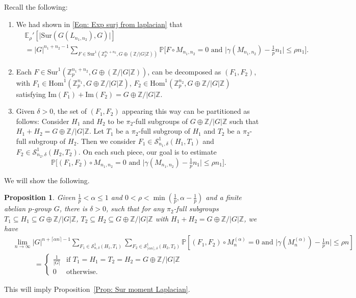 \documentclass[12pt]{amsart}
\newtheorem{proposition}[theorem]{Proposition}
\theoremstyle{definition}
\newcommand{\PPP}{\mathbb{P}}
\newcommand{\SSO}[3]{\mathcal{S}^1_{#1}(#2,#3)}
\newcommand{\Mnot}{M_{n_1,n_2}}
\newcommand{\Lnot}{L_{n_1,n_2}}
\newcommand{\Mna}{M_{n}^{(\alpha)}}
\newcommand{\Erhop}{\E_{\rho}'}
\newcommand{\ZG}{\Z/\abs{G}\Z}
\newcommand{\abs}[1]{\vert#1\vert}
\newcommand{\im}{\text{Im}}
\newcommand{\Zpnot}{\Z_p^{n_1+n_2}}
\newcommand{\Zp}{\Z_p}
\newcommand{\E}{\mathbb{E}}
\newcommand{\Z}{\mathbb{Z}}
\newcommand{\Hom}{\text{Hom}}
\newcommand{\Sur}{\text{Sur}}
\newcommand{\ceil}[1]{\lceil#1\rceil}
\begin{document}
Recall the following:
\begin{enumerate}
    \item We had shown in \eqref{Eqn: Exp surj from laplacian} that
    \begin{align*}
    &\Erhop[\abs{\Sur(G(\Lnot),G)}]\\
    &=\abs{G}^{n_1+n_2-1}\!\!\!\!\!\!\!\!\!\!\!\! \sum_{F\in\Sur^1(\Zpnot,G\oplus (\ZG))}\!\!\!\!\!\!\!\!\!\!\!\!
    \PPP\Big[F\circ \Mnot=0 \text{ and }\abs{\gamma(\Mnot) -\tfrac{1}{p} n_1}\leq \rho n_1\Big].
    \end{align*}
    \item Each $F\in\Sur^1(\Zpnot,G\oplus (\ZG))$, can be decomposed as $(F_1, F_2)$, with $F_1\in \Hom^1(\Zp^{n_1},G\oplus\ZG)$, $F_2\in \Hom^1(\Zp^{n_2},G\oplus \ZG)$ satisfying $\im(F_1)+\im(F_2)=G\oplus\ZG$.
    \item Given $\delta>0$, the set of $(F_1,F_2)$ appearing this way can be partitioned as follows:
    Consider $H_1$ and $H_2$ to be $\pi_2$-full subgroups of $G\oplus\ZG$ such that $H_1+H_2=G\oplus\ZG$. Let $T_1$ be a $\pi_2$-full subgroup of $H_1$ and $T_2$ be a $\pi_2$-full subgroup of $H_2$. Then we consider $F_1\in \SSO{n_1,\delta}{H_1}{T_1}$ and $F_2\in \SSO{n_2,\delta}{H_2}{T_2}$.
    On each such piece, our goal is to estimate
\[
\PPP\Big[(F_1,F_2)\circ \Mnot=0 \text{ and }\abs{\gamma(\Mnot) -\tfrac{1}{p} n_1}\leq \rho n_1\Big].
\]
\end{enumerate}

We will show the following.
\begin{proposition}\label{Prop: Laplacian pieces}
Given $\frac{1}{p}<\alpha\leq 1$ and $0<\rho<\min(\frac{1}{p},\alpha-\frac{1}{p})$ and a finite abelian $p$-group $G$, there is $\delta>0$, such that for any $\pi_2$-full subgroups $T_1\subseteq H_1\subseteq G\oplus \ZG$, $T_2\subseteq H_2\subseteq G\oplus\ZG$ with $H_1+H_2=G\oplus\ZG$, we have
\begin{align*}
&\lim_{n\to\infty}
\abs{G}^{n+\ceil{\alpha n}-1}
\sum_{F_1\in \SSO{n,\delta}{H_1}{T_1}}
\sum_{F_2\in \SSO{\ceil{\alpha n},\delta}{H_2}{T_2}}
\PPP[(F_1,F_2)\circ \Mna=0 \text{ and } \abs{\gamma(\Mna)-\tfrac{1}{p}n} \leq \rho n]\\
&\quad\quad\quad=\begin{cases}
\frac{1}{\abs{G}} &\text{if } T_1=H_1=T_2=H_2=G\oplus\ZG\\
0 &\text{otherwise}.
\end{cases}
\end{align*}
\end{proposition}
This will imply Proposition~\ref{Prop: Sur moment Laplacian}.
\end{document}

